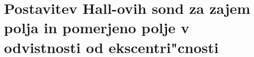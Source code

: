 \section{Postavitev Hall-ovih sond za zajem polja in pomerjeno polje v odvistnosti od ekscentri"cnosti}
%
%
%
%
%
%
%
%
%
%


